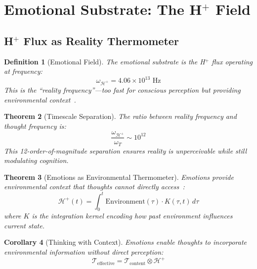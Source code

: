 \documentclass[aps,prd,twocolumn,superscriptaddress,floatfix,nofootinbib]{revtex4-2}
\newtheorem{theorem}{Theorem}[section]
\newtheorem{corollary}[theorem]{Corollary}
\newtheorem{definition}[theorem]{Definition}
\theoremstyle{remark}
\newcommand{\Tcat}{\mathcal{T}}
\newcommand{\Hfield}{\mathcal{H}^+}
\begin{document}
\section{Emotional Substrate: The H$^+$ Field}
\label{sec:emotion}

\subsection{H$^+$ Flux as Reality Thermometer}

\begin{definition}[Emotional Field]
\label{def:hfield}
The emotional substrate is the H$^+$ flux operating at frequency:
\begin{equation}
\omega_{\Hfield} = 4.06 \times 10^{13} \text{ Hz}
\end{equation}
This is the ``reality frequency''---too fast for conscious perception but providing environmental context~\cite{mitchell1961coupling,wikstrom2015proton,berg1993random}.
\end{definition}

\begin{theorem}[Timescale Separation]
\label{thm:timescale}
The ratio between reality frequency and thought frequency is:
\begin{equation}
\frac{\omega_{\Hfield}}{\omega_T} \sim 10^{12}
\end{equation}
This 12-order-of-magnitude separation ensures reality is \emph{unperceivable} while still modulating cognition.
\end{theorem}

\begin{theorem}[Emotions as Environmental Thermometer]
\label{thm:emotion_thermometer}
Emotions provide environmental context that thoughts cannot directly access~\cite{damasio1994descartes,ledoux2000emotion}:
\begin{equation}
\Hfield(t) = \int_0^t \text{Environment}(\tau) \cdot K(\tau, t) \, d\tau
\end{equation}
where $K$ is the integration kernel encoding how past environment influences current state.
\end{theorem}

\begin{corollary}[Thinking with Context]
\label{cor:context}
Emotions enable thoughts to incorporate environmental information without direct perception:
\begin{equation}
\Tcat_{\text{effective}} = \Tcat_{\text{content}} \otimes \Hfield
\end{equation}
\end{corollary}
\end{document}
